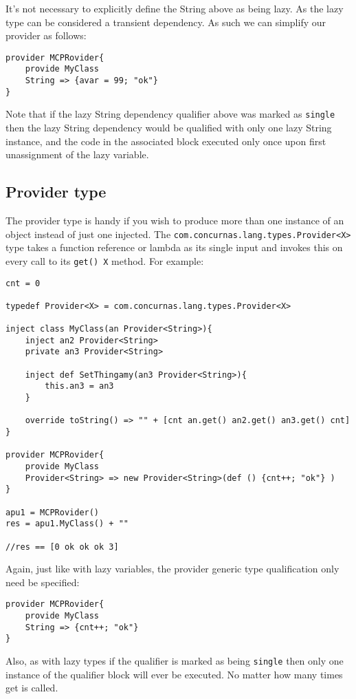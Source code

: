 \documentclass[conc-doc]{subfiles}
\begin{document}
It's not necessary to explicitly define the String above as being lazy. As the lazy type can be considered a transient dependency. As such we can simplify our provider as follows:

\begin{lstlisting}
provider MCPRovider{
	provide MyClass
	String => {avar = 99; "ok"}
}
\end{lstlisting}

Note that if the lazy String dependency qualifier above was marked as \lstinline{single} then the lazy String dependency would be qualified with only one lazy String instance, and the code in the associated block executed only once upon first unassignment of the lazy variable.

\subsection{Provider type}
The provider type is handy if you wish to produce more than one instance of an object instead of just one injected. The \lstinline{com.concurnas.lang.types.Provider<X>} type takes a function reference or lambda as its single input and invokes this on every call to its \lstinline{get() X} method. For example:

\begin{lstlisting}
cnt = 0

typedef Provider<X> = com.concurnas.lang.types.Provider<X>

inject class MyClass(an Provider<String>){
	inject an2 Provider<String>
	private an3 Provider<String>

	inject def SetThingamy(an3 Provider<String>){
		this.an3 = an3
	}
	
	override toString() => "" + [cnt an.get() an2.get() an3.get() cnt]
}

provider MCPRovider{
	provide MyClass
	Provider<String> => new Provider<String>(def () {cnt++; "ok"} )
}

apu1 = MCPRovider()
res = apu1.MyClass() + ""

//res == [0 ok ok ok 3]
\end{lstlisting}

Again, just like with lazy variables, the provider generic type qualification only need be specified:

\begin{lstlisting}
provider MCPRovider{
	provide MyClass
	String => {cnt++; "ok"}
}
\end{lstlisting}

Also, as with lazy types if the qualifier is marked as being \lstinline{single} then only one instance of the qualifier block will ever be executed. No matter how many times get is called.
\end{document}
